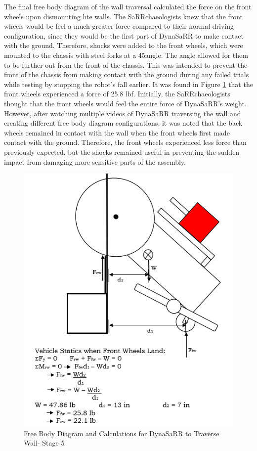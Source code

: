 The final free body diagram of the wall traversal calculated the force on the front wheels upon dismounting hte walls. The SaRRchaeologists knew that the front wheels would be feel a much greater force compared to their normal driving configuration, since they would be the first part of DynaSaRR to make contact with the ground. Therefore, shocks were added to the front wheels, which were mounted to the chassis with steel forks at a 45\degree angle. The angle allowed for them to be further out from the front of the chassis. This was intended to prevent the front of the chassis from making contact with the ground during any failed trials while testing by stopping the robot's fall earlier. It was found in Figure \ref{fig:analysis7_wall5} that the front wheels experienced a force of 25.8 lbf. Initially, the SaRRchaeologists thought that the front wheels would feel the entire force of DynaSaRR's weight. However, after watching multiple videos of DynaSaRR traversing the wall and creating different free body diagram configurations, it was noted that the back wheels remained in contact with the wall when the front wheels first made contact with the ground. Therefore, the front wheels experienced less force than previously expected, but the shocks remained useful in preventing the sudden impact from damaging more sensitive parts of the assembly.

\label{fig:analysis7_wall5}
\begin{figure}[hb]
    \centering
    \includegraphics[width=0.7\linewidth]{Images/analysis7_wall5.png}
    \caption{Free Body Diagram and Calculations for DynaSaRR to Traverse Wall- Stage 5}
    \label{fig:analysis7_wall5}
\end{figure}
\vfill
\newpage
\clearpage

